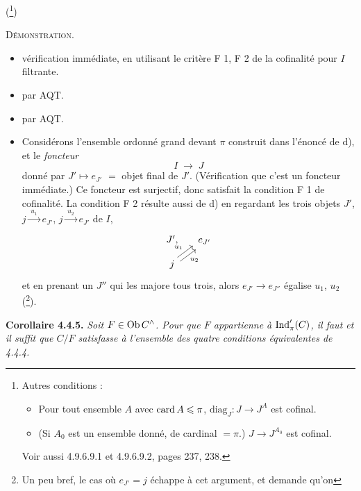 (\footnote{Autres conditions :
\begin{itemize}[leftmargin=3em]
\item[e)] Pour tout ensemble $A$ avec $\operatorname{card} A \leqslant \pi$, $\mathrm{diag}_J : J \longrightarrow J^A$ est cofinal.
\item[e$'$)] (Si $A_0$ est un ensemble donné, de cardinal $= \pi$.) $J \longrightarrow J^{A_0}$ est cofinal.
\end{itemize}
Voir aussi 4.9.6.9.1 et 4.9.6.9.2, pages 237, 238.})

\textsc{Démonstration}.
\begin{itemize}[leftmargin=7em,labelwidth=6em,align=left]
\item[a $\;\Longrightarrow\;$ b] vérification immédiate, en utilisant le critère F 1, F 2 de la cofinalité pour $I$ filtrante.
\item[b $\;\Longrightarrow\;$ c] par AQT.
\item[c $\;\Longrightarrow\;$ d] par AQT.
\end{itemize}

\begin{itemize}[leftmargin=7em,labelwidth=6em,align=left]
\item[d $\;\Longrightarrow\;$ a] Considérons l'ensemble ordonné grand devant $\pi$ construit dans l'énoncé de d), et le \textit{foncteur}
\[
I \;\longrightarrow\; J
\]
donné par $J' \longmapsto e_{J'}$ $=$ objet final de $J'$. (Vérification que c'est un foncteur immédiate.) Ce foncteur est surjectif, donc satisfait la condition F 1 de cofinalité. La condition F 2 résulte aussi de d) en regardant les trois objets $J'$, $j \xrightarrow{\;u_1\;} e_{J'}$, $j \xrightarrow{\;u_2\;} e_{J'}$ de $I$,
\[
\begin{tikzcd}[column sep=small, row sep=small]
J', & e_{J'} \\
j \arrow[ur, shift left, "u_1"] \arrow[ur, shift right, "u_2"'] &
\end{tikzcd}
\]
et en prenant un $J''$ qui les majore tous trois, alors $e_{J'} \longrightarrow e_{J''}$ égalise $u_1$, $u_2$ (\footnote{Un peu bref, le cas où $e_{J'} = j$ échappe à cet argument, et demande qu'on}).
\end{itemize}

\textbf{Corollaire 4.4.5.} \textit{Soit $F \in \mathrm{Ob}\, C^{\wedge}$. Pour que $F$ appartienne à} $\operatorname{Ind}'_\pi(C)$\textit{, il faut et il suffit que $C/F$ satisfasse à l'ensemble des quatre conditions équivalentes de 4.4.4.}

